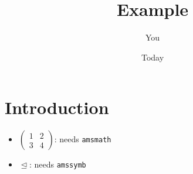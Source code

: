 \documentclass{article}
\title{Example}
\author{You}
\date{Today}
\begin{document}
\maketitle

\section{Introduction}
\begin{itemize}
    \item $\begin{pmatrix}
        1 & 2 \\ 3 & 4
    \end{pmatrix}$: needs \verb+amsmath+
    \item $\trianglelefteq$: needs \verb+amssymb+
\end{itemize}
\end{document}
